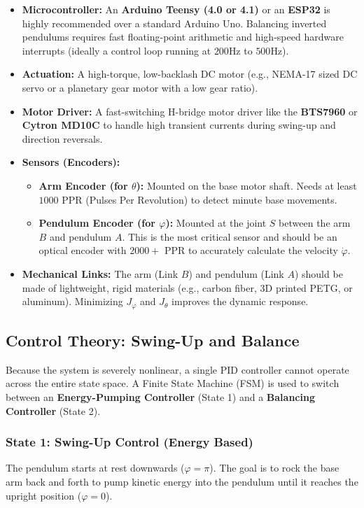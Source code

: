 \documentclass[12pt]{article}
\begin{document}
\begin{itemize}
    \item \textbf{Microcontroller:} An \textbf{Arduino Teensy (4.0 or 4.1)} or an \textbf{ESP32} is highly recommended over a standard Arduino Uno. Balancing inverted pendulums requires fast floating-point arithmetic and high-speed hardware interrupts (ideally a control loop running at $200\text{Hz}$ to $500\text{Hz}$).
    \item \textbf{Actuation:} A high-torque, low-backlash DC motor (e.g., NEMA-17 sized DC servo or a planetary gear motor with a low gear ratio). 
    \item \textbf{Motor Driver:} A fast-switching H-bridge motor driver like the \textbf{BTS7960} or \textbf{Cytron MD10C} to handle high transient currents during swing-up and direction reversals.
    \item \textbf{Sensors (Encoders):} 
        \begin{itemize}
            \item \textbf{Arm Encoder (for $\theta$):} Mounted on the base motor shaft. Needs at least $1000$ PPR (Pulses Per Revolution) to detect minute base movements.
            \item \textbf{Pendulum Encoder (for $\varphi$):} Mounted at the joint $S$ between the arm $B$ and pendulum $A$. This is the most critical sensor and should be an optical encoder with $2000+$ PPR to accurately calculate the velocity $\dot{\varphi}$.
        \end{itemize}
    \item \textbf{Mechanical Links:} The arm (Link $B$) and pendulum (Link $A$) should be made of lightweight, rigid materials (e.g., carbon fiber, 3D printed PETG, or aluminum). Minimizing $J_\varphi$ and $J_\theta$ improves the dynamic response.
\end{itemize}

\subsection{Control Theory: Swing-Up and Balance}

Because the system is severely nonlinear, a single PID controller cannot operate across the entire state space. A Finite State Machine (FSM) is used to switch between an \textbf{Energy-Pumping Controller} (State 1) and a \textbf{Balancing Controller} (State 2).

\subsubsection{State 1: Swing-Up Control (Energy Based)}
The pendulum starts at rest downwards ($\varphi = \pi$). The goal is to rock the base arm back and forth to pump kinetic energy into the pendulum until it reaches the upright position ($\varphi = 0$).
\end{document}
